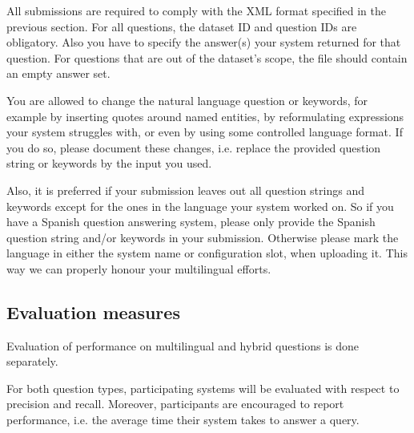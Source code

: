 All submissions are required to comply with the XML format specified in the previous section. 
For all questions, the dataset ID and question IDs are obligatory. 
Also you have to specify the answer(s) your system returned for that question. 
For questions that are out of the dataset's scope, the file should contain an empty answer set.

You are allowed to change the natural language question or keywords, for example by inserting quotes around named entities, 
by reformulating expressions your system struggles with, or even by using some controlled language format. 
If you do so, please document these changes, i.e. replace the provided question string or keywords by the input you used. 

Also, it is preferred if your submission leaves out all question strings and keywords except for the ones in the language your system worked on. 
So if you have a Spanish question answering system, please only provide the Spanish question string and/or keywords in your submission. 
Otherwise please mark the language in either the system name or configuration slot, when uploading it. 
This way we can properly honour your multilingual efforts.


\subsection{Evaluation measures} 
\label{evalmeasures}

Evaluation of performance on multilingual and hybrid questions is done separately. 

For both question types, participating systems will be evaluated with respect to precision and recall. 
Moreover, participants are encouraged to report performance, i.e. the average time their system takes to answer a query.

